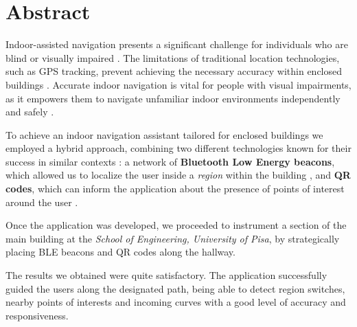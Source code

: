 \section{Abstract}

Indoor-assisted navigation presents a significant challenge for individuals who are blind or visually impaired \cite{9126068, MURATA201914, en12193702, s20030636}.
The limitations of traditional location technologies, such as GPS tracking, prevent achieving the necessary accuracy within enclosed buildings \cite{RAZAVI2012128, localization-taxonomy}.
Accurate indoor navigation is vital for people with visual impairments, as it empowers them to navigate unfamiliar indoor environments independently and safely \cite{9126068}.

To achieve an indoor navigation assistant tailored for enclosed buildings we employed a hybrid approach, combining two different technologies known for their success in similar contexts \cite{MURATA201914, s20030636}: 
a network of \textbf{Bluetooth Low Energy beacons}, which allowed us to localize the user inside a \textit{region} within the building \cite{localization-taxonomy, 10.1145/3058555.3058560, en12193702}, and \textbf{QR codes}, which can inform the application about the presence of points of interest around the user \cite{indoor-navigation-qr-codes}.

Once the application was developed, we proceeded to instrument a section of the main building at the \textit{School of Engineering, University of Pisa}, by strategically placing BLE beacons and QR codes along the hallway.

The results we obtained were quite satisfactory. The application successfully guided the users along the designated path, being able to detect region switches, nearby points of interests and incoming curves with a good level of accuracy and responsiveness.
